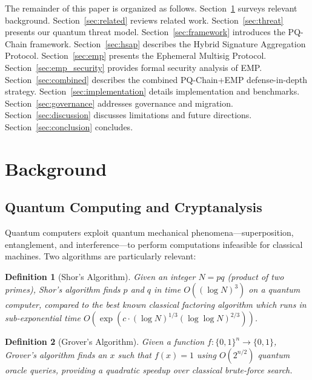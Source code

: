 \documentclass[12pt, a4paper, twocolumn]{article}
\newtheorem{definition}{Definition}
\begin{document}
The remainder of this paper is organized as follows. Section~\ref{sec:background} surveys relevant background. Section~\ref{sec:related} reviews related work. Section~\ref{sec:threat} presents our quantum threat model. Section~\ref{sec:framework} introduces the PQ-Chain framework. Section~\ref{sec:hsap} describes the Hybrid Signature Aggregation Protocol. Section~\ref{sec:emp} presents the Ephemeral Multisig Protocol. Section~\ref{sec:emp_security} provides formal security analysis of EMP. Section~\ref{sec:combined} describes the combined PQ-Chain+EMP defense-in-depth strategy. Section~\ref{sec:implementation} details implementation and benchmarks. Section~\ref{sec:governance} addresses governance and migration. Section~\ref{sec:discussion} discusses limitations and future directions. Section~\ref{sec:conclusion} concludes.

\section{Background}
\label{sec:background}

\subsection{Quantum Computing and Cryptanalysis}

Quantum computers exploit quantum mechanical phenomena---superposition, entanglement, and interference---to perform computations infeasible for classical machines. Two algorithms are particularly relevant:

\begin{definition}[Shor's Algorithm]
Given an integer $N = pq$ (product of two primes), Shor's algorithm finds $p$ and $q$ in time $O((\log N)^3)$ on a quantum computer, compared to the best known classical factoring algorithm which runs in sub-exponential time $O\!\left(\exp\!\left(c \cdot (\log N)^{1/3} (\log\log N)^{2/3}\right)\right)$.
\end{definition}

\begin{definition}[Grover's Algorithm]
Given a function $f:\{0,1\}^n \to \{0,1\}$, Grover's algorithm finds an $x$ such that $f(x) = 1$ using $O(2^{n/2})$ quantum oracle queries, providing a quadratic speedup over classical brute-force search.
\end{definition}
\end{document}
